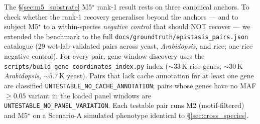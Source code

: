 The §\ref{sec:m5_substrate} M5$^\star$ rank-1 result rests on three
canonical anchors. To check whether the rank-1 recovery generalises
beyond the anchors --- and to subject M5$^\star$ to a within-species
\emph{negative control} that should NOT recover --- we extended the
benchmark to the full \texttt{docs/groundtruth/epistasis\_pairs.json}
catalogue (29 wet-lab-validated pairs across yeast, \emph{Arabidopsis},
and rice; one rice negative control). For every pair, gene-window
discovery uses the \texttt{scripts/build\_gene\_coordinates\_index.py}
index ($\sim$$33\,$K rice genes, $\sim$$30\,$K \emph{Arabidopsis}, $\sim$$5.7\,$K
yeast). Pairs that lack cache annotation for at least one gene are
classified \texttt{UNTESTABLE\_NO\_CACHE\_ANNOTATION}; pairs whose
genes have no MAF$\geq 0.05$ variant in the loaded panel windows are
\texttt{UNTESTABLE\_NO\_PANEL\_VARIATION}. Each testable pair runs M2
(motif-filtered) and M5$^\star$ on a Scenario-A simulated phenotype
identical to §\ref{sec:cross_species}.

